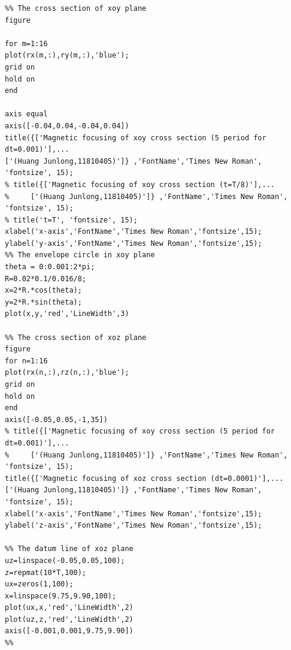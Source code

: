 \documentclass[journal,twocolumn,letterpaper]{IEEEJERM}
\begin{document}
\begin{lstlisting}
%% The cross section of xoy plane
figure

for m=1:16
plot(rx(m,:),ry(m,:),'blue');
grid on
hold on
end

axis equal
axis([-0.04,0.04,-0.04,0.04])
title({['Magnetic focusing of xoy cross section (5 period for dt=0.001)'],...
['(Huang Junlong,11810405)']} ,'FontName','Times New Roman', 'fontsize', 15);           
% title({['Magnetic focusing of xoy cross section (t=T/8)'],...
%     ['(Huang Junlong,11810405)']} ,'FontName','Times New Roman', 'fontsize', 15); 
% title('t=T', 'fontsize', 15); 
xlabel('x-axis','FontName','Times New Roman','fontsize',15);                      
ylabel('y-axis','FontName','Times New Roman','fontsize',15);  
%% The envelope circle in xoy plane
theta = 0:0.001:2*pi;
R=0.02*0.1/0.016/8;
x=2*R.*cos(theta);
y=2*R.*sin(theta);
plot(x,y,'red','LineWidth',3)

%% The cross section of xoz plane
figure
for n=1:16
plot(rx(n,:),rz(n,:),'blue');
grid on
hold on
end
axis([-0.05,0.05,-1,35])
% title({['Magnetic focusing of xoy cross section (5 period for dt=0.001)'],...
%     ['(Huang Junlong,11810405)']} ,'FontName','Times New Roman', 'fontsize', 15);           
title({['Magnetic focusing of xoz cross section (dt=0.0001)'],...
['(Huang Junlong,11810405)']} ,'FontName','Times New Roman', 'fontsize', 15); 
xlabel('x-axis','FontName','Times New Roman','fontsize',15);                      
ylabel('z-axis','FontName','Times New Roman','fontsize',15); 

%% The datum line of xoz plane
uz=linspace(-0.05,0.05,100);
z=repmat(10*T,100);
ux=zeros(1,100);
x=linspace(9.75,9.90,100);
plot(ux,x,'red','LineWidth',2)
plot(uz,z,'red','LineWidth',2)
axis([-0.001,0.001,9.75,9.90])
%%
\end{lstlisting}
\end{document}
